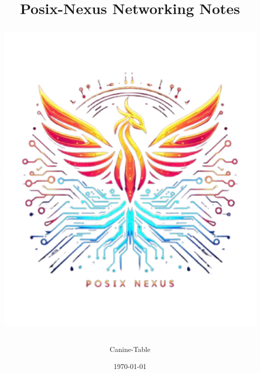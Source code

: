 \documentclass[a4paper,12pt]{article}
\begin{document}
	\label{top}
	\title{
		\hspace{48px}\textbf{Posix-Nexus Networking Notes}\\[10mm]
		\begin{NexMainBox}[dark, shpA,fit, width=\linewidth/2]
			\includegraphics[width=\textwidth]{img/posix-nexus.png}
		\end{NexMainBox}
	}
	\author{Canine-Table}
	\date{\today}
	\maketitle
	\newpage
	\begin{NexMainBox}[light, title=Contents, hdrB, breakable]
		\thispagestyle{plain}
		\tableofcontents
	\end{NexMainBox}
	\newpage
	
	
	
	
	
	
	
	
	
\end{document}
